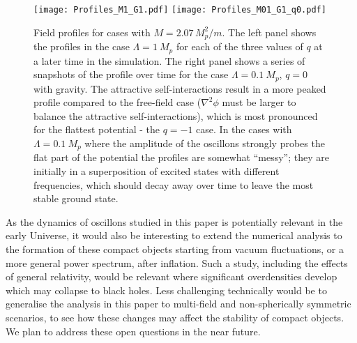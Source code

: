\documentclass[11pt,a4paper]{article}
\begin{document}
\begin{figure}[h!]\centering
\texttt{[image: Profiles\_M1\_G1.pdf]}
\texttt{[image: Profiles\_M01\_G1\_q0.pdf]}
\caption{Field profiles for cases with $M = 2.07 \, M_p^2/m$. The left panel shows the profiles in the case  $\Lambda=1 ~M_p$ for each of the three values of $q$ at a later time in the simulation.  The right panel shows a series of snapshots of the profile over time for the case $\Lambda=0.1 ~M_p$, $q=0$ with gravity. The attractive self-interactions result in a more peaked profile compared to the free-field case ($\nabla^2 \phi$ must be larger to balance the attractive self-interactions), which is most pronounced for the flattest potential - the $q=-1$ case. In the cases with $\Lambda=0.1 ~M_p$ where the amplitude of the oscillons strongly probes the flat part of the potential the profiles are somewhat ``messy''; they are initially in a superposition of excited states with different frequencies, which should decay away over time to leave the most stable ground state. \label{fig:fieldprofiles}}
\end{figure} 
 
As the dynamics of oscillons studied in this paper is potentially relevant in the early Universe, it would also be interesting to extend the numerical analysis to the formation of these compact objects starting from vacuum fluctuations, or a more general power spectrum, after inflation. Such a study, including the effects of general relativity, would be relevant where significant overdensities develop which may collapse to black holes. Less challenging technically would be to generalise the analysis in this paper to multi-field and non-spherically symmetric scenarios, to see how these changes may affect the stability of compact objects. We plan to address these open questions in the near future.

\end{document}
